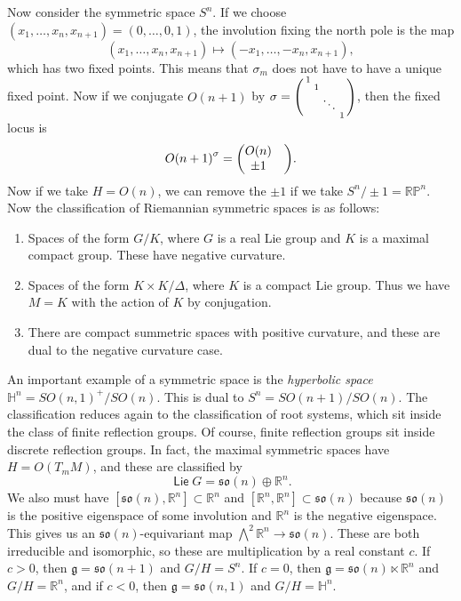 \documentclass[leqno, openany]{memoir}
\theoremstyle{definition}
\theoremstyle{remark}
\theoremstyle{plain}
\theoremstyle{definition}
\theoremstyle{remark}
\newcommand{\R}{\mathbb{R}}
\renewcommand{\H}{\mathbb{H}}
\renewcommand{\P}{\mathbb{P}}
\newcommand{\mf}[1]{\mathfrak{#1}}
\DeclareMathOperator{\Lie}{\mathsf{Lie}}
\begin{document}
Now consider the symmetric space $S^n$. If we choose $( x_1, \ldots, x_n, x_{n+1} ) = (0,\ldots,0, 1)$, the involution fixing the north pole is the map
\[ (x_1, \ldots, x_n, x_{n+1}) \mapsto (-x_1, \ldots, -x_n, x_{n+1}), \]
which has two fixed points. This means that $\sigma_m$ does not have to have a unique fixed point. Now if we conjugate $O(n+1)$ by $\sigma = \begin{psmallmatrix}
    1 & & \\
      & 1 & \\
      & & \ddots \\
      & & & 1
\end{psmallmatrix}$, then the fixed locus is 
\[ {O(n+1)}^{\sigma} = \mqty(O(n) & \\ \pm 1 & ). \]
Now if we take $H = O(n)$, we can remove the $\pm 1$ if we take $S^n/\pm 1 = \R\P^n$. Now the classification of Riemannian symmetric spaces is as follows:
\begin{enumerate}
    \item Spaces of the form $G/K$, where $G$ is a real Lie group and $K$ is a maximal compact group. These have negative curvature.
    \item Spaces of the form $K \times K / \Delta$, where $K$ is a compact Lie group. Thus we have $M = K$ with the action of $K$ by conjugation. 
    \item There are compact summetric spaces with positive curvature, and these are dual to the negative curvature case.
\end{enumerate}

An important example of a symmetric space is the \textit{hyperbolic space} $\H^n = { SO(n,1) }^+ / SO(n)$. This is dual to $S^n = SO(n+1)/SO(n)$. The classification reduces again to the classification of root systems, which sit inside the class of finite reflection groups. Of course, finite reflection groups sit inside discrete reflection groups. In fact, the maximal symmetric spaces have $H = O(T_m M)$, and these are classified by 
\[ \Lie G = \mf{so}(n) \oplus \R^n. \]
We also must have $[\mf{so}(n), \R^n] \subset \R^n$ and $[\R^n, \R^n] \subset \mf{so}(n)$ because $\mf{so}(n)$ is the positive eigenspace of some involution and $\R^n$ is the negative eigenspace. This gives us an $\mf{so}(n)$-equivariant map $\bigwedge^2 \R^n \to \mf{so}(n)$. These are both irreducible and isomorphic, so these are multiplication by a real constant $c$. If $c > 0$, then $\mf{g} = \mf{so}(n+1)$ and $G/H = S^n$. If $c = 0$, then $\mf{g} = \mf{so}(n) \ltimes \R^n$ and $G/H = \R^n$, and if $c < 0$, then $\mf{g} = \mf{so}(n,1)$ and $G/H = \H^n$.
\end{document}
